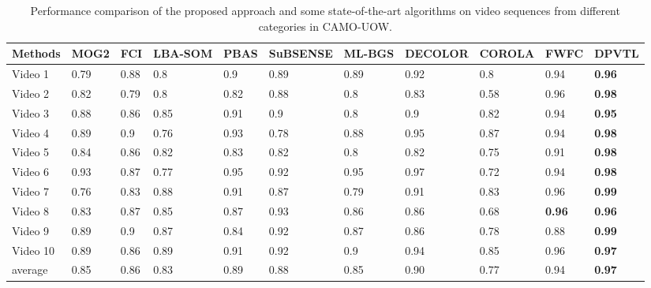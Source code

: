 \documentclass[journal]{IEEEtran}
\begin{document}
    
    \begin{table}[!t]
\centering
\caption{Performance comparison of the proposed approach and some state-of-the-art algorithms on video sequences from different categories in CAMO-UOW.}
\label{tab3}
\begin{tabular}{lllllllllll}
\hline
Methods  & MOG2\cite{ZIVKOVIC2006773} & FCI\cite{Baf2008FCI}  & LBA-SOM\cite{LBA-SOM2008} & PBAS & SuBSENSE & ML-BGS\cite{ML-BGS2007} & DECOLOR\cite{DECOLOR2013}       & COROLA\cite{SHAKERI201628} & FWFC\cite{Li2018CAMO}          & DPVTL          \\ \hline
Video 1  & 0.79 & 0.88 & 0.8     & 0.9  & 0.89     & 0.89   & 0.92          & 0.8    & 0.94 & \textbf{0.96} \\
Video 2  & 0.82 & 0.79 & 0.8     & 0.82 & 0.88     & 0.8    & 0.83          & 0.58   & 0.96          & \textbf{0.98} \\
Video 3  & 0.88 & 0.86 & 0.85    & 0.91 & 0.9      & 0.8    & 0.9           & 0.82   & 0.94 & \textbf{0.95} \\
Video 4  & 0.89 & 0.9  & 0.76    & 0.93 & 0.78     & 0.88   & 0.95          & 0.87   & 0.94          & \textbf{0.98} \\
Video 5  & 0.84 & 0.86 & 0.82    & 0.83 & 0.82     & 0.8    & 0.82          & 0.75   & 0.91          & \textbf{0.98} \\
Video 6  & 0.93 & 0.87 & 0.77    & 0.95 & 0.92     & 0.95   & 0.97	      & 0.72   & 0.94          & \textbf{0.98}  \\
Video 7  & 0.76 & 0.83 & 0.88    & 0.91 & 0.87     & 0.79   & 0.91          & 0.83   & 0.96          & \textbf{0.99} \\
Video 8  & 0.83 & 0.87 & 0.85    & 0.87 & 0.93     & 0.86   & 0.86          & 0.68   & \textbf{0.96}          & \textbf{0.96} \\
Video 9  & 0.89 & 0.9  & 0.87    & 0.84 & 0.92     & 0.87   & 0.86          & 0.78   & 0.88          & \textbf{0.99} \\
Video 10 & 0.89 & 0.86 & 0.89    & 0.91 & 0.92     & 0.9    & 0.94          & 0.85   & 0.96          & \textbf{0.97} \\ \hline
average  & 0.85 & 0.86 & 0.83    & 0.89 & 0.88     & 0.85   & 0.90          & 0.77   & 0.94          & \textbf{0.97} \\ \hline
\end{tabular}
\end{table}
\end{document}
